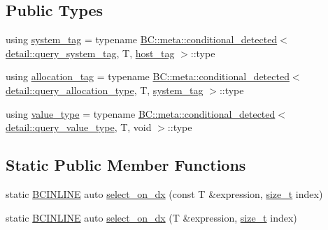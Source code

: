 \subsection*{Public Types}
\begin{DoxyCompactItemize}
\item 
using \hyperlink{structBC_1_1tensors_1_1exprs_1_1expression__traits_a15729391a3675a8a223645a666e69178}{system\+\_\+tag} = typename \hyperlink{structBC_1_1meta_1_1conditional__detected}{B\+C\+::meta\+::conditional\+\_\+detected}$<$ \hyperlink{namespaceBC_1_1tensors_1_1exprs_1_1detail_a78ddbc90d8902249df20ae15022d9274}{detail\+::query\+\_\+system\+\_\+tag}, T, \hyperlink{structBC_1_1host__tag}{host\+\_\+tag} $>$\+::type
\item 
using \hyperlink{structBC_1_1tensors_1_1exprs_1_1expression__traits_afabecef46ed2bcd596923189b244b384}{allocation\+\_\+tag} = typename \hyperlink{structBC_1_1meta_1_1conditional__detected}{B\+C\+::meta\+::conditional\+\_\+detected}$<$ \hyperlink{namespaceBC_1_1tensors_1_1exprs_1_1detail_af7ba0020a7b4a640c05dbf54f8085f29}{detail\+::query\+\_\+allocation\+\_\+type}, T, \hyperlink{structBC_1_1tensors_1_1exprs_1_1expression__traits_a15729391a3675a8a223645a666e69178}{system\+\_\+tag} $>$\+::type
\item 
using \hyperlink{structBC_1_1tensors_1_1exprs_1_1expression__traits_ac886019065ee32295c353fc7cbb0e41a}{value\+\_\+type} = typename \hyperlink{structBC_1_1meta_1_1conditional__detected}{B\+C\+::meta\+::conditional\+\_\+detected}$<$ \hyperlink{namespaceBC_1_1tensors_1_1exprs_1_1detail_aa067d25adc2a68a08de1456648d9bf2c}{detail\+::query\+\_\+value\+\_\+type}, T, void $>$\+::type
\end{DoxyCompactItemize}
\subsection*{Static Public Member Functions}
\begin{DoxyCompactItemize}
\item 
static \hyperlink{BlackCat__Common_8h_a6699e8b0449da5c0fafb878e59c1d4b1}{B\+C\+I\+N\+L\+I\+NE} auto \hyperlink{structBC_1_1tensors_1_1exprs_1_1expression__traits_af0cf58250172b30fa59905f5142b1ba6}{select\+\_\+on\+\_\+dx} (const T \&expression, \hyperlink{namespaceBC_a6007cbc4eeec401a037b558910a56173}{size\+\_\+t} index)
\item 
static \hyperlink{BlackCat__Common_8h_a6699e8b0449da5c0fafb878e59c1d4b1}{B\+C\+I\+N\+L\+I\+NE} auto \hyperlink{structBC_1_1tensors_1_1exprs_1_1expression__traits_a6a2bbc4d8b4b5a3f85686ec9b4aadde2}{select\+\_\+on\+\_\+dx} (T \&expression, \hyperlink{namespaceBC_a6007cbc4eeec401a037b558910a56173}{size\+\_\+t} index)
\end{DoxyCompactItemize}

